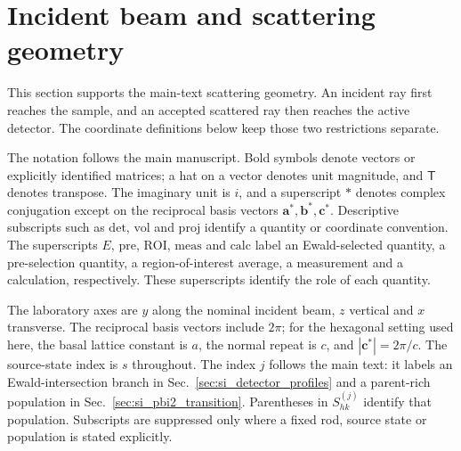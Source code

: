 \section{Incident beam and scattering geometry}
\label{sec:si_geometric_ray_acceptance}

This section supports the main-text scattering geometry. An incident ray first reaches the sample, and an accepted scattered ray then reaches the active detector. The coordinate definitions below keep those two restrictions separate.

The notation follows the main manuscript. Bold symbols denote vectors or explicitly identified matrices; a hat on a vector denotes unit magnitude, and $\mathsf T$ denotes transpose. The imaginary unit is $i$, and a superscript $*$ denotes complex conjugation except on the reciprocal basis vectors $\mathbf a^*,\mathbf b^*,\mathbf c^*$. Descriptive subscripts such as $\mathrm{det}$, $\mathrm{vol}$ and $\mathrm{proj}$ identify a quantity or coordinate convention. The superscripts $E$, $\mathrm{pre}$, $\mathrm{ROI}$, $\mathrm{meas}$ and $\mathrm{calc}$ label an Ewald-selected quantity, a pre-selection quantity, a region-of-interest average, a measurement and a calculation, respectively. These superscripts identify the role of each quantity.

The laboratory axes are $y$ along the nominal incident beam, $z$ vertical and $x$ transverse. The reciprocal basis vectors include $2\pi$; for the hexagonal setting used here, the basal lattice constant is $a$, the normal repeat is $c$, and $|\mathbf c^*|=2\pi/c$. The source-state index is $s$ throughout. The index $j$ follows the main text: it labels an Ewald-intersection branch in Sec.~\ref{sec:si_detector_profiles} and a parent-rich population in Sec.~\ref{sec:si_pbi2_transition}. Parentheses in $S_{hk}^{(j)}$ identify that population. Subscripts are suppressed only where a fixed rod, source state or population is stated explicitly.


